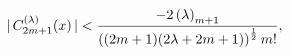 \[|\mathop{C^{(\lambda)}_{2m+1}\/}\nolimits\!\left(x\right)|<\frac{-2\left(%
\lambda\right)_{m+1}}{\left((2m+1)(2\lambda+2m+1)\right)^{\frac{1}{2}}m!},\]
